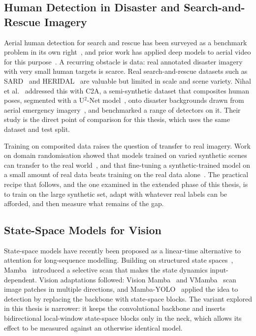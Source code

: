 \documentclass[12pt,a4paper,oneside]{report}
\begin{document}
\subsection{Human Detection in Disaster and Search-and-Rescue Imagery}
Aerial human detection for search and rescue has been surveyed as a benchmark
problem in its own right~\cite{sar_survey}, and prior work has applied deep models
to aerial video for this purpose~\cite{aerial_human_video}. A recurring obstacle is
data: real annotated disaster imagery with very small human targets is scarce. Real
search-and-rescue datasets such as SARD~\cite{sambolek2021sard} and
HERIDAL~\cite{bozic2019heridal} are valuable but limited in scale and scene variety.
Nihal et al.~\cite{nihal2024c2a} addressed this with C2A, a semi-synthetic dataset
that composites human poses, segmented with a U$^2$-Net model~\cite{qin2020u2net},
onto disaster backgrounds drawn from aerial emergency
imagery~\cite{kyrkou2020aider}, and benchmarked a range of detectors on it. Their
study is the direct point of comparison for this thesis, which uses the same dataset
and test split.

Training on composited data raises the question of transfer to real imagery.
Work on domain randomisation showed that models trained on varied synthetic
scenes can transfer to the real world~\cite{tobin2017domainrand}, and that
fine-tuning a synthetic-trained model on a small amount of real data beats
training on the real data alone~\cite{tremblay2018synthetic}. The practical
recipe that follows, and the one examined in the extended phase of this
thesis, is to train on the large synthetic set, adapt with whatever real
labels can be afforded, and then measure what remains of the gap.

\subsection{State-Space Models for Vision}
State-space models have recently been proposed as a linear-time alternative to
attention for long-sequence modelling. Building on structured state
spaces~\cite{gu2022s4}, Mamba~\cite{gu2023mamba} introduced a selective scan that
makes the state dynamics input-dependent. Vision adaptations followed: Vision
Mamba~\cite{zhu2024visionmamba} and VMamba~\cite{liu2024vmamba} scan image patches in
multiple directions, and Mamba-YOLO~\cite{wang2025mambayolo} applied the idea to
detection by replacing the backbone with state-space blocks. The variant explored in
this thesis is narrower: it keeps
the convolutional backbone and inserts bidirectional local-window state-space
blocks only in the neck, which allows its effect to be measured against an
otherwise identical model.
\end{document}
